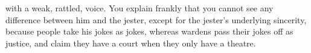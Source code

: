 with a weak, rattled, voice.
You explain frankly that you cannot see any difference between him and the jester, except for the jester's underlying sincerity, because people take his jokes as jokes, whereas \glspl{warden} pass their jokes off as justice, and claim they have a court when they only have a theatre.

